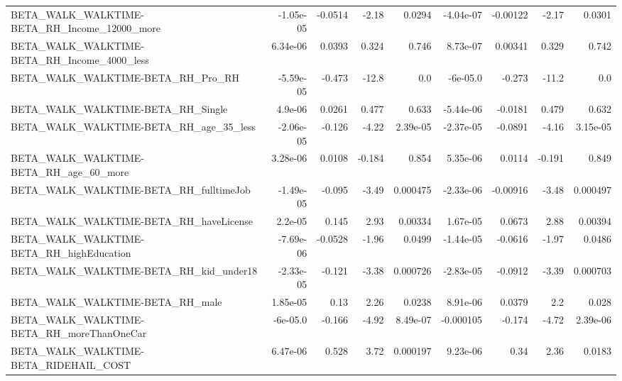 \begin{tabular}{lrrrrrrrr}
BETA\_WALK\_WALKTIME-BETA\_RH\_Income\_12000\_more       &   -1.05e-05 &      -0.0514 &     -2.18 &   0.0294 &  -4.04e-07 &    -0.00122 &        -2.17 &        0.0301 \\
BETA\_WALK\_WALKTIME-BETA\_RH\_Income\_4000\_less        &    6.34e-06 &       0.0393 &     0.324 &    0.746 &   8.73e-07 &     0.00341 &        0.329 &         0.742 \\
BETA\_WALK\_WALKTIME-BETA\_RH\_Pro\_RH                  &   -5.59e-05 &       -0.473 &     -12.8 &      0.0 &   -6e-05.0 &      -0.273 &        -11.2 &           0.0 \\
BETA\_WALK\_WALKTIME-BETA\_RH\_Single                  &     4.9e-06 &       0.0261 &     0.477 &    0.633 &  -5.44e-06 &     -0.0181 &        0.479 &         0.632 \\
BETA\_WALK\_WALKTIME-BETA\_RH\_age\_35\_less             &   -2.06e-05 &       -0.126 &     -4.22 & 2.39e-05 &  -2.37e-05 &     -0.0891 &        -4.16 &      3.15e-05 \\
BETA\_WALK\_WALKTIME-BETA\_RH\_age\_60\_more             &    3.28e-06 &       0.0108 &    -0.184 &    0.854 &   5.35e-06 &      0.0114 &       -0.191 &         0.849 \\
BETA\_WALK\_WALKTIME-BETA\_RH\_fulltimeJob             &   -1.49e-05 &       -0.095 &     -3.49 & 0.000475 &  -2.33e-06 &    -0.00916 &        -3.48 &      0.000497 \\
BETA\_WALK\_WALKTIME-BETA\_RH\_haveLicense             &     2.2e-05 &        0.145 &      2.93 &  0.00334 &   1.67e-05 &      0.0673 &         2.88 &       0.00394 \\
BETA\_WALK\_WALKTIME-BETA\_RH\_highEducation           &   -7.69e-06 &      -0.0528 &     -1.96 &   0.0499 &  -1.44e-05 &     -0.0616 &        -1.97 &        0.0486 \\
BETA\_WALK\_WALKTIME-BETA\_RH\_kid\_under18             &   -2.33e-05 &       -0.121 &     -3.38 & 0.000726 &  -2.83e-05 &     -0.0912 &        -3.39 &      0.000703 \\
BETA\_WALK\_WALKTIME-BETA\_RH\_male                    &    1.85e-05 &         0.13 &      2.26 &   0.0238 &   8.91e-06 &      0.0379 &          2.2 &         0.028 \\
BETA\_WALK\_WALKTIME-BETA\_RH\_moreThanOneCar          &    -6e-05.0 &       -0.166 &     -4.92 & 8.49e-07 &  -0.000105 &      -0.174 &        -4.72 &      2.39e-06 \\
BETA\_WALK\_WALKTIME-BETA\_RIDEHAIL\_COST              &    6.47e-06 &        0.528 &      3.72 & 0.000197 &   9.23e-06 &        0.34 &         2.36 &        0.0183 \\

\end{tabular}
